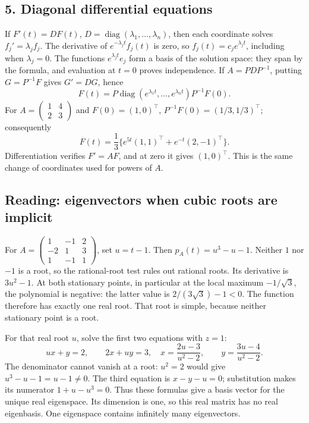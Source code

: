\subsection*{5. Diagonal differential equations}
If \(F'(t)=DF(t)\), \(D=\operatorname{diag}(\lambda_1,\ldots,\lambda_n)\),
then each coordinate solves \(f_j'=\lambda_j f_j\).
The derivative of \(e^{-\lambda_jt}f_j(t)\) is zero, so
\(f_j(t)=c_je^{\lambda_jt}\), including when \(\lambda_j=0\).
The functions \(e^{\lambda_jt}e_j\) form a basis of the solution space:
they span by the formula, and evaluation at \(t=0\) proves independence.
If \(A=PDP^{-1}\), putting \(G=P^{-1}F\) gives \(G'=DG\), hence
\[
 F(t)=P\operatorname{diag}(e^{\lambda_1t},\ldots,e^{\lambda_nt})P^{-1}F(0).
\]
For \(A=\begin{pmatrix}1&4\\2&3\end{pmatrix}\) and \(F(0)=(1,0)^\top\),
\(P^{-1}F(0)=(1/3,1/3)^\top\); consequently
\[
 F(t)=\frac13\{e^{5t}(1,1)^\top+e^{-t}(2,-1)^\top\}.
\]
Differentiation verifies \(F'=AF\), and at zero it gives \((1,0)^\top\).
This is the same change of coordinates used for powers of \(A\).

\subsection*{Reading: eigenvectors when cubic roots are implicit}
For \(A=\begin{pmatrix}1&-1&2\\-2&1&3\\1&-1&1\end{pmatrix}\), set
\(u=t-1\). Then \(p_A(t)=u^3-u-1\). Neither \(1\) nor \(-1\)
is a root, so the rational-root test rules out rational roots.
Its derivative is \(3u^2-1\). At both stationary points, in particular
at the local maximum \(-1/\sqrt3\), the polynomial is negative:
the latter value is \(2/(3\sqrt3)-1<0\).
The function therefore has exactly one real root. That root is simple,
because neither stationary point is a root.

For that real root \(u\), solve the first two equations with \(z=1\):
\[
 ux+y=2,\qquad 2x+uy=3,
 \quad
 x=\frac{2u-3}{u^2-2},\qquad y=\frac{3u-4}{u^2-2}.
\]
The denominator cannot vanish at a root: \(u^2=2\) would give
\(u^3-u-1=u-1\ne0\).
The third equation is \(x-y-u=0\); substitution makes its numerator
\(1+u-u^3=0\). Thus these formulas give a basis vector for the unique
real eigenspace. Its dimension is one, so this real matrix has no real
eigenbasis. One eigenspace contains infinitely many eigenvectors.

